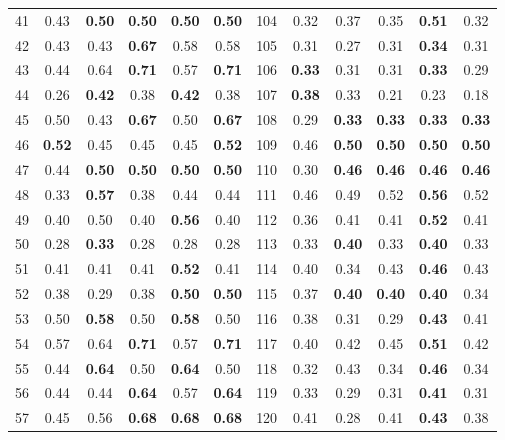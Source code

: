 \documentclass{article}
\begin{document}
{\begin{longtable}{cccccc@{\qquad}cccccc}
41 & 0.43 & \textbf{0.50} & \textbf{0.50} & \textbf{0.50} & \textbf{0.50} & 104 & 0.32 & 0.37 & 0.35 & \textbf{0.51} & 0.32 \\
42 & 0.43 & 0.43 & \textbf{0.67} & 0.58 & 0.58 & 105 & 0.31 & 0.27 & 0.31 & \textbf{0.34} & 0.31 \\
43 & 0.44 & 0.64 & \textbf{0.71} & 0.57 & \textbf{0.71} & 106 & \textbf{0.33} & 0.31 & 0.31 & \textbf{0.33} & 0.29 \\
44 & 0.26 & \textbf{0.42} & 0.38 & \textbf{0.42} & 0.38 & 107 & \textbf{0.38} & 0.33 & 0.21 & 0.23 & 0.18 \\
45 & 0.50 & 0.43 & \textbf{0.67} & 0.50 & \textbf{0.67} & 108 & 0.29 & \textbf{0.33} & \textbf{0.33} & \textbf{0.33} & \textbf{0.33} \\
46 & \textbf{0.52} & 0.45 & 0.45 & 0.45 & \textbf{0.52} & 109 & 0.46 & \textbf{0.50} & \textbf{0.50} & \textbf{0.50} & \textbf{0.50} \\
47 & 0.44 & \textbf{0.50} & \textbf{0.50} & \textbf{0.50} & \textbf{0.50} & 110 & 0.30 & \textbf{0.46} & \textbf{0.46} & \textbf{0.46} & \textbf{0.46} \\
48 & 0.33 & \textbf{0.57} & 0.38 & 0.44 & 0.44 & 111 & 0.46 & 0.49 & 0.52 & \textbf{0.56} & 0.52 \\
49 & 0.40 & 0.50 & 0.40 & \textbf{0.56} & 0.40 & 112 & 0.36 & 0.41 & 0.41 & \textbf{0.52} & 0.41 \\
50 & 0.28 & \textbf{0.33} & 0.28 & 0.28 & 0.28 & 113 & 0.33 & \textbf{0.40} & 0.33 & \textbf{0.40} & 0.33 \\
51 & 0.41 & 0.41 & 0.41 & \textbf{0.52} & 0.41 & 114 & 0.40 & 0.34 & 0.43 & \textbf{0.46} & 0.43 \\
52 & 0.38 & 0.29 & 0.38 & \textbf{0.50} & \textbf{0.50} & 115 & 0.37 & \textbf{0.40} & \textbf{0.40} & \textbf{0.40} & 0.34 \\
53 & 0.50 & \textbf{0.58} & 0.50 & \textbf{0.58} & 0.50 & 116 & 0.38 & 0.31 & 0.29 & \textbf{0.43} & 0.41 \\
54 & 0.57 & 0.64 & \textbf{0.71} & 0.57 & \textbf{0.71} & 117 & 0.40 & 0.42 & 0.45 & \textbf{0.51} & 0.42 \\
55 & 0.44 & \textbf{0.64} & 0.50 & \textbf{0.64} & 0.50 & 118 & 0.32 & 0.43 & 0.34 & \textbf{0.46} & 0.34 \\
56 & 0.44 & 0.44 & \textbf{0.64} & 0.57 & \textbf{0.64} & 119 & 0.33 & 0.29 & 0.31 & \textbf{0.41} & 0.31 \\
57 & 0.45 & 0.56 & \textbf{0.68} & \textbf{0.68} & \textbf{0.68} & 120 & 0.41 & 0.28 & 0.41 & \textbf{0.43} & 0.38 \\

\end{longtable}}
\end{document}

